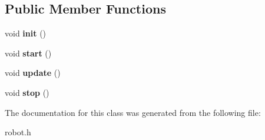 \subsection*{Public Member Functions}
\begin{DoxyCompactItemize}
\item 
\hypertarget{classIntruder_a38e5fdfbecaa4a3b7f9e927631422ffc}{void {\bfseries init} ()}\label{classIntruder_a38e5fdfbecaa4a3b7f9e927631422ffc}

\item 
\hypertarget{classIntruder_affa4e38dfc67f72e4f551351698be7b6}{void {\bfseries start} ()}\label{classIntruder_affa4e38dfc67f72e4f551351698be7b6}

\item 
\hypertarget{classIntruder_a286f987e30fecdb59a7eb12776891f7d}{void {\bfseries update} ()}\label{classIntruder_a286f987e30fecdb59a7eb12776891f7d}

\item 
\hypertarget{classIntruder_a4bd6180c90d70ec2d6d3067bdf65bf2e}{void {\bfseries stop} ()}\label{classIntruder_a4bd6180c90d70ec2d6d3067bdf65bf2e}

\end{DoxyCompactItemize}


The documentation for this class was generated from the following file\+:\begin{DoxyCompactItemize}
\item 
robot.\+h\end{DoxyCompactItemize}
